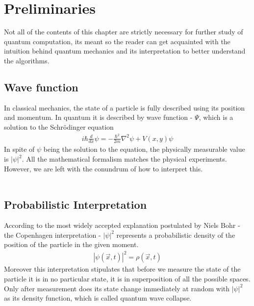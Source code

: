 \section{Preliminaries}
Not all of the contents of this chapter are strictly necessary for further study of quantum computation, its meant so the reader can get acquainted with the intuition behind quantum mechanics and its interpretation to better understand the algorithms.
\subsection{Wave function}
In classical mechanics, the state of a particle is fully described using its position and momentum. In quantum it is described by wave function - $\Psi$, which is a solution to the Schrödinger equation 
\begin{align*}
  i \hbar \frac{d}{dx} \psi=-\frac{\hbar^2}{2m}\nabla^2 \psi + V(x,y)\psi 
\end{align*}
In spite of $\psi$ being the solution to the equation, the physically measurable value is $|\psi|^2$. All the mathematical formalism matches the physical experiments. However, we are left with the conundrum of how to interpret this. \\\\
\subsection{Probabilistic Interpretation}
According to the most widely accepted explanation postulated by Niels Bohr - the Copenhagen interpretation - $|\psi|^2$ represents a probabilistic density of the position of the particle in the given moment.
\begin{align*}
  |\psi(\vec{x},t)|^2=\rho(\vec{x},t)
\end{align*}
Moreover this interpretation stipulates that before we measure the state of the particle it is in no particular state, it is in superposition of all the possible spaces. Only after measurement does its state change immediately at random with $|\psi|^2$ as its density function, which is called quantum wave collapse.\\

